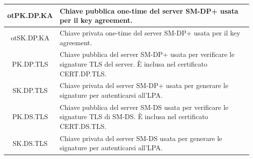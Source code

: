 \documentclass[10pt, twoside, openany]{book}
\begin{document}
\begin{table}[h!]
\begin{center}
\begin{tabularx}{\textwidth}{|c|X|}
otPK.DP.KA & Chiave pubblica one-time del server SM-DP+ usata per il key agreement.\\
\hline
otSK.DP.KA & Chiave privata one-time del server SM-DP+ usata per il key agreement.\\
\hline
PK.DP.TLS & Chiave pubblica del server SM-DP+ usata per verificare le signature TLS del server. È inclusa nel certificato CERT.DP.TLS.\\
\hline
SK.DP.TLS & Chiave privata del server SM-DP+ usata per generare le signature per autenticarsi all'LPA.\\
\hline
PK.DS.TLS & Chiave pubblica del server SM-DS usata per verificare le signature TLS di SM-DS. È inclusa nel certificato CERT.DS.TLS.\\
\hline
SK.DS.TLS & Chiave privata del server SM-DS usata per generare le signature per autenticarsi all'LPA.\\
\hline
\end{tabularx}
\end{center}
\end{table}
\end{document}
